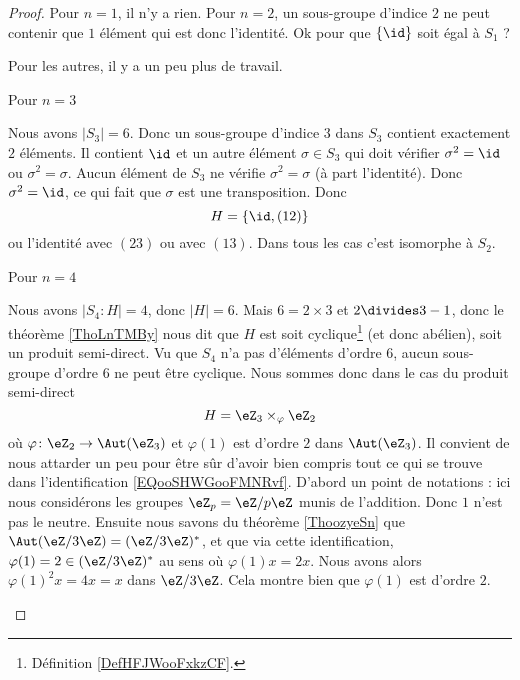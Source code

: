 \begin{proof}
    Pour \( n=1\), il n'y a rien. Pour \( n=2\), un sous-groupe d'indice \( 2\) ne peut contenir que \( 1\) élément qui est donc l'identité. Ok pour que \( \{ \id \}\) soit égal à \( S_1\) ?

    Pour les autres, il y a un peu plus de travail.

    \begin{subproof}
        \item[Pour \( n=3\)]
        
            Nous avons \( | S_3 |=6\). Donc un sous-groupe d'indice $3$ dans \( S_3\) contient exactement \( 2\) éléments. Il contient \( \id\) et un autre élément \( \sigma\in S_3\) qui doit vérifier \( \sigma^2=\id\) ou \( \sigma^2=\sigma\). Aucun élément de \( S_3\) ne vérifie \( \sigma^2=\sigma\) (à part l'identité). Donc \( \sigma^2=\id\), ce qui fait que \( \sigma\) est une transposition. Donc 
            \begin{equation}
                H=\{ \id,(12) \}
            \end{equation}
            ou l'identité avec \( (23)\) ou avec \( (13)\). Dans tous les cas c'est isomorphe à \( S_2\).

        \item[Pour \( n=4\)]

            Nous avons \( | S_4:H |=4\), donc \( | H |=6\). Mais \( 6=2\times 3\) et \( 2\divides 3-1\), donc le théorème \ref{ThoLnTMBy} nous dit que \( H\) est soit cyclique\footnote{Définition \ref{DefHFJWooFxkzCF}.} (et donc abélien), soit un produit semi-direct. Vu que \( S_4\) n'a pas d'éléments d'ordre $6$, aucun sous-groupe d'ordre \( 6\) ne peut être cyclique. Nous sommes donc dans le cas du produit semi-direct
            \begin{equation}        \label{EQooSHWGooFMNRvf}
                H=\eZ_3\times_{\varphi}\eZ_2
            \end{equation}
            où \( \varphi\colon \eZ_2\to \Aut(\eZ_3)\) et \( \varphi(1)\) est d'ordre \( 2\) dans \( \Aut(\eZ_3)\). Il convient de nous attarder un peu pour être sûr d'avoir bien compris tout ce qui se trouve dans l'identification \eqref{EQooSHWGooFMNRvf}. D'abord un point de notations : ici nous considérons les groupes \( \eZ_p=\eZ/p\eZ\) munis de l'addition. Donc \( 1\) n'est pas le neutre. Ensuite nous savons du théorème \ref{ThoozyeSn} que \( \Aut(\eZ/3\eZ)=(\eZ/3\eZ)^*\), et que via cette identification, \( \varphi(1)=2\in(\eZ/3\eZ)^*\) au sens où \( \varphi(1)x=2x\). Nous avons alors \( \varphi(1)^2x=4x=x\) dans \( \eZ/3\eZ\). Cela montre bien que \( \varphi(1)\) est d'ordre \( 2\).


\end{subproof}
\end{proof}
